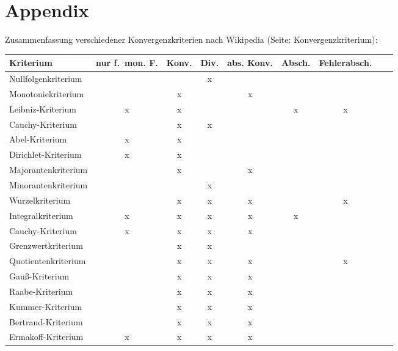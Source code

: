 \documentclass[10pt]{article}
\begin{document}
    \pagebreak
    \part{Appendix}
    Zusammenfassung verschiedener Konvergenzkriterien nach Wikipedia (Seite: Konvergenzkriterium):
    \begin{center}
        \begin{tabular}{lcccccccp{2cm}}
             \toprule
             Kriterium & {nur f.\ mon. F.} & Konv. & Div. & abs. Konv. & Absch. & Fehlerabsch.\\
             \midrule
             Nullfolgenkriterium &  &  & x &  &  & \\
             Monotoniekriterium &  & x &  & x &  & \\
             Leibniz-Kriterium & x & x &  &  & x & x\\
             Cauchy-Kriterium &  & x & x &  &  & \\
             Abel-Kriterium & x & x &  &  &  & \\
             Dirichlet-Kriterium & x & x &  &  &  & \\
             Majorantenkriterium &  & x &  & x &  & \\
             Minorantenkriterium &  &  & x &  &  & \\
             Wurzelkriterium &  & x & x & x &  & x\\
             Integralkriterium & x & x & x & x & x & \\
             Cauchy-Kriterium & x & x & x & x &  & \\
             Grenzwertkriterium &  & x & x &  &  & \\
             Quotientenkriterium &  & x & x & x &  & x\\
             Gauß-Kriterium &  & x & x & x &  & \\
             Raabe-Kriterium &  & x & x & x &  & \\
             Kummer-Kriterium &  & x & x & x &  & \\
             Bertrand-Kriterium &  & x & x & x &  & \\
             Ermakoff-Kriterium & x & x & x & x &  & \\
             \bottomrule
        \end{tabular}
    \end{center}
\end{document}
